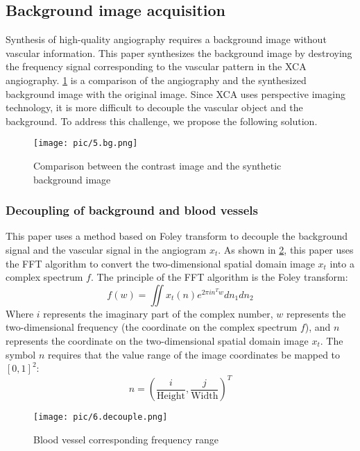 \subsection{Background image acquisition}

Synthesis of high-quality angiography requires a background image without vascular information. This paper synthesizes the background image by destroying the frequency signal corresponding to the vascular pattern in the XCA angiography. 
\cref{fig:bg} is a comparison of the angiography and the synthesized background image with the original image. 
Since XCA uses perspective imaging technology, 
it is more difficult to decouple the vascular object and the background. 
To address this challenge, we propose the following solution.

\begin{figure}[htbp]
  \centering
  \texttt{[image: pic/5.bg.png]}
  \caption{Comparison between the contrast image and the synthetic background image}
  \label{fig:bg}
\end{figure}


\subsubsection{Decoupling of background and blood vessels}
This paper uses a method based on Foley transform to decouple the background signal and the vascular signal in the angiogram $x_t$. 
As shown in \cref{fig:decouple}, this paper uses the FFT algorithm to convert the two-dimensional spatial domain image $x_t$ into a complex spectrum $f$. The principle of the FFT algorithm is the Foley transform:
\begin{equation}
f(w) = \iint x_t(n) e^{2\pi i n^T w} dn_1 dn_2
\end{equation}
Where $i$ represents the imaginary part of the complex number, $w$ represents the two-dimensional frequency (the coordinate on the complex spectrum $f$), and $n$ represents the coordinate on the two-dimensional spatial domain image $x_t$. The symbol $n$ requires that the value range of the image coordinates be mapped to $[0,1]^2$:
\begin{equation}
n = \left( \frac{i}{\text{Height}}, \frac{j}{\text{Width}} \right)^T
\end{equation}

\begin{figure}[htbp]
  \centering
  \texttt{[image: pic/6.decouple.png]}
  \caption{Blood vessel corresponding frequency range}
  \label{fig:decouple}
\end{figure}


